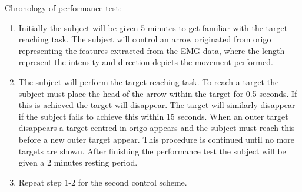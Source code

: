 Chronology of performance test:
\begin{enumerate}
	\item Initially the subject will be given 5 minutes to get familiar with the target-reaching task. The subject will control an arrow originated from origo representing the features extracted from the EMG data, where the length represent the intensity and direction depicts the movement performed.
	\item The subject will perform the target-reaching task. To reach a target the subject must place the head of the arrow within the target for 0.5 seconds. If this is achieved the target will disappear. The target will similarly disappear if the subject fails to achieve this within 15 seconds. When an outer target disappears a target centred in origo appears and the subject must reach this before a new outer target appear. This procedure is continued until no more targets are shown. After finishing the performance test the subject will be given a 2 minutes resting period.
	\item Repeat step 1-2 for the second control scheme. 
\end{enumerate}
 







